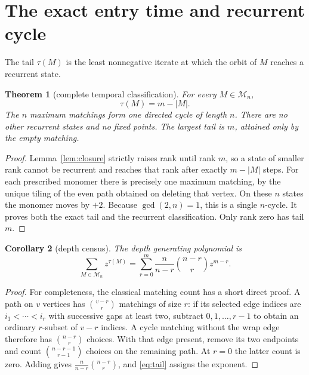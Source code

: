 \documentclass[a4paper,10pt]{amsart}
\newtheorem{theorem}{Theorem}[section]
\newtheorem{corollary}[theorem]{Corollary}
\theoremstyle{remark}
\newcommand{\calM}{\mathcal M}
\begin{document}
\section{The exact entry time and recurrent cycle}
The tail $\tau(M)$ is the least nonnegative iterate at which the orbit of
$M$ reaches a recurrent state.
\begin{theorem}[complete temporal classification]\label{thm:time}
For every $M\in\calM_n$,
\begin{equation}\label{eq:tail}
 \tau(M)=m-|M|.
\end{equation}
The $n$ maximum matchings form one directed cycle of length $n$. There
are no other recurrent states and no fixed points. The largest tail is
$m$, attained only by the empty matching.
\end{theorem}
\begin{proof}
Lemma~\ref{lem:closure} strictly raises rank until rank $m$, so a state of
smaller rank cannot be recurrent and reaches that rank after exactly
$m-|M|$ steps. For each prescribed monomer there is precisely one maximum
matching, by the unique tiling of the even path obtained on deleting that
vertex. On these $n$ states the monomer moves by $+2$. Because
$\gcd(2,n)=1$, this is a single $n$-cycle. It proves both the exact tail
and the recurrent classification. Only rank zero has tail $m$.
\end{proof}

\begin{corollary}[depth census]\label{cor:depth}
The depth generating polynomial is
\begin{equation}\label{eq:depth}
 \sum_{M\in\calM_n}z^{\tau(M)}
 =\sum_{r=0}^{m}\frac{n}{n-r}\binom{n-r}{r}z^{m-r}.
\end{equation}
\end{corollary}
\begin{proof}
For completeness, the classical matching count has a short direct proof.
A path on $v$ vertices has $\binom{v-r}{r}$ matchings of size $r$:
if its selected edge indices are $i_1<\cdots<i_r$ with successive gaps
at least two, subtract $0,1,\ldots,r-1$ to obtain an ordinary $r$-subset
of $v-r$ indices. A cycle matching without the wrap edge therefore has
$\binom{n-r}{r}$ choices. With that edge present, remove its two endpoints
and count $\binom{n-r-1}{r-1}$ choices on the remaining path. At $r=0$
the latter count is zero. Adding gives
$\frac{n}{n-r}\binom{n-r}{r}$, and \eqref{eq:tail} assigns the exponent.
\end{proof}
\end{document}

